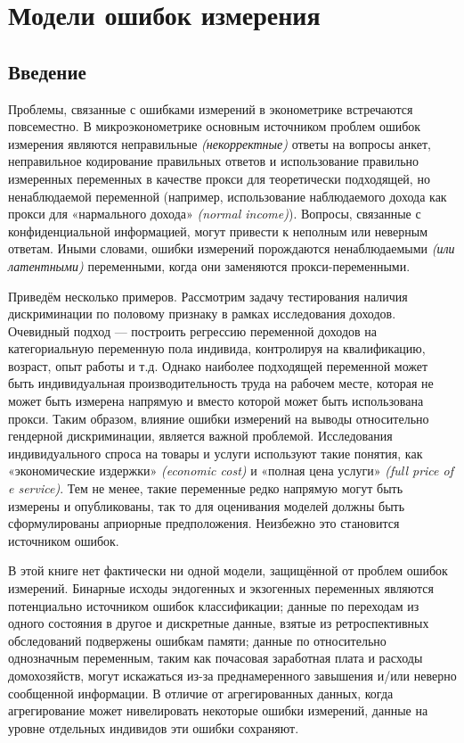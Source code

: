 

\chapter{Модели ошибок измерения}

\section{Введение}
Проблемы, связанные с ошибками измерений в эконометрике встречаются повсеместно. В микроэконометрике основным источником проблем ошибок измерения являются неправильные \emph{(некорректные)} ответы на вопросы анкет, неправильное кодирование правильных ответов и использование правильно измеренных переменных в качестве прокси для теоретически подходящей, но ненаблюдаемой переменной (например, использование наблюдаемого дохода как прокси для «нармального дохода» \emph{(normal income)}).  Вопросы, связанные с конфиденциальной информацией, могут привести к неполным или неверным ответам. Иными словами, ошибки измерений порождаются ненаблюдаемыми \emph{(или латентными)} переменными, когда  они заменяются прокси-переменными.

Приведём несколько примеров. Рассмотрим задачу тестирования наличия дискриминации по половому признаку в рамках исследования доходов. Очевидный подход --- построить регрессию переменной доходов на категориальную переменную пола индивида, контролируя на квалификацию, возраст, опыт работы и т.д. Однако наиболее подходящей переменной может быть индивидуальная производительность труда на рабочем месте, которая не может быть измерена напрямую и вместо которой может быть использована прокси. Таким образом, влияние ошибки измерений на выводы относительно гендерной дискриминации, является важной проблемой. Исследования индивидуального спроса на товары и услуги используют такие понятия, как «экономические издержки» \emph{(economic cost)} и «полная цена услуги» \emph{(full price of e service)}. Тем не менее, такие переменные редко напрямую могут быть измерены и опубликованы, так то для оценивания моделей должны быть сформулированы априорные предположения.  Неизбежно это становится источником ошибок.

В этой книге нет фактически ни одной модели, защищённой от проблем ошибок измерений. Бинарные исходы эндогенных и экзогенных переменных являются потенциально источником ошибок классификации; данные по переходам из одного состояния в другое и дискретные данные, взятые из ретроспективных обследований подвержены ошибкам памяти; данные по относительно однозначным переменным, таким как почасовая заработная плата и расходы домохозяйств, могут искажаться из-за преднамеренного завышения и/или неверно сообщенной информации. В отличие от агрегированных данных, когда агрегирование может нивелировать некоторые ошибки измерений, данные на уровне отдельных индивидов эти ошибки сохраняют.

